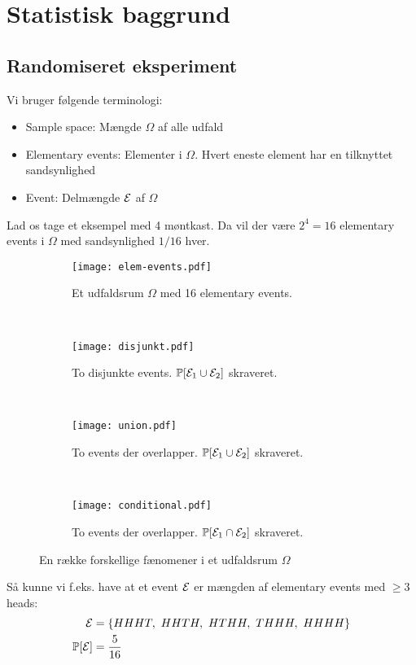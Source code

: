 \section{Statistisk baggrund}

\subsection{Randomiseret eksperiment}
Vi bruger følgende terminologi:
\begin{itemize}
	\item Sample space: Mængde $\Omega$ af alle udfald
	\item Elementary events: Elementer i $\Omega$. Hvert eneste element har en tilknyttet sandsynlighed
	\item Event: Delmængde ${\mathcal{E}}$ af $\Omega$
\end{itemize}

Lad os tage et eksempel med 4 møntkast. Da vil der være $2^4 = 16$ elementary events i $\Omega$ med sandsynlighed $1/16$ hver.


\begin{figure}[H]
	\centering
	\begin{subfigure}[b]{0.23\textwidth}
		\texttt{[image: elem-events.pdf]}
		\caption{Et udfaldsrum $\Omega$ med 16 elementary events.}
		\label{fig:elem}
	\end{subfigure}
	~
	\begin{subfigure}[b]{0.23\textwidth}
		\texttt{[image: disjunkt.pdf]}
		\caption{To disjunkte events. ${\mathbb P}[{\mathcal{E}}_1 \cup {\mathcal{E}}_2]$ skraveret.}
		\label{fig:disjunkt}
	\end{subfigure}
	~
	\begin{subfigure}[b]{0.23\textwidth}
		\texttt{[image: union.pdf]}
		\caption{To events der overlapper. ${\mathbb P}[{\mathcal{E}}_1 \cup {\mathcal{E}}_2]$ skraveret.}
		\label{fig:union}
	\end{subfigure}
	~
	\begin{subfigure}[b]{0.23\textwidth}
		\texttt{[image: conditional.pdf]}
		\caption{To events der overlapper. ${\mathbb P}[{\mathcal{E}}_1 \cap {\mathcal{E}}_2]$ skraveret.}
		\label{fig:conditional}
	\end{subfigure}
	\caption{En række forskellige fænomener i et udfaldsrum $\Omega$}
	\label{fig:sample-spaces}
\end{figure}


Så kunne vi f.eks. have at et event ${\mathcal{E}}$ er mængden af elementary events med $\geq 3$ heads:
\begin{align*}
{\mathcal{E}} &= \left\{ HHHT, \ HHTH, \ HTHH, \ THHH, \ HHHH \right\}\\
{\mathbb P}[{\mathcal{E}}] &= \frac{5}{16}
\end{align*}

